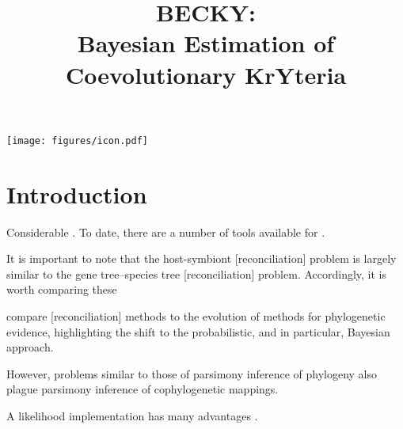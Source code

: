 \documentclass[12pt,letterpaper]{article}
\title{BECKY:\\Bayesian Estimation of Coevolutionary KrYteria}
\begin{document}
\begin{titlepage}
\null
\vfil
\let\newpage\relax\maketitle
\vfil
\centering
\texttt{[image: figures/icon.pdf]}
\vfil
\end{titlepage}

\newpage

\doublespacing

\section*{Introduction}

Considerable . To date, there are a number of tools available for .

It is important to note that the host-symbiont [reconciliation] problem is largely similar to the gene tree--species tree [reconciliation] problem. Accordingly, it is worth comparing these 

\textcite{Akerborg:2009} compare [reconciliation] methods to the evolution of methods for phylogenetic evidence, highlighting the shift to the probabilistic, and in particular, Bayesian approach.

However, problems similar to those of parsimony inference of phylogeny also plague parsimony inference of cophylogenetic mappings.

A likelihood implementation has many advantages \parencite{Charleston:2009}.
\end{document}
